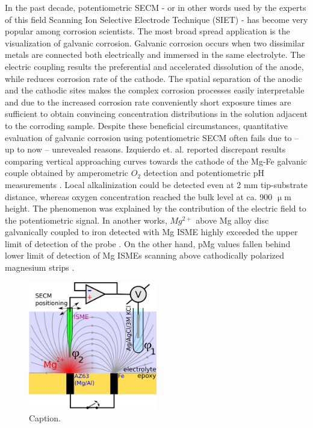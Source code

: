\documentclass[3p]{elsarticle}
\begin{document}
In the past decade, potentiometric SECM - or in other words used by the experts of this field Scanning Ion Selective Electrode Technique (SIET) - has become very popular among corrosion scientists\cite{lamaka, ZnISME, diamondel, cutedge, H+selective, simulating}. The most broad spread application is the visualization of galvanic corrosion\cite{amperopot, chloride, spatiozn, fezn}.
Galvanic corrosion occurs when two dissimilar metals are connected both electrically and immersed in the same electrolyte. The electric coupling results the preferential and accelerated dissolution of the anode, while reduces corrosion rate of the cathode. The spatial separation of the anodic and the cathodic sites makes the complex corrosion processes easily interpretable and due to the increased corrosion rate conveniently short exposure times are sufficient to obtain convincing concentration distributions in the solution adjacent to the corroding sample. Despite these beneficial circumstances, quantitative evaluation of galvanic corrosion using potentiometric SECM often fails due to – up to now – unrevealed reasons.
Izquierdo et. al. reported discrepant results comparing vertical approaching curves towards the cathode of the Mg-Fe galvanic couple obtained by amperometric $O_2$ detection and potentiometric pH measurements \cite{pH15}. Local alkalinization could be detected even at 2 mm tip-substrate distance, whereas oxygen concentration reached the bulk level at ca. 900 $\upmu$m height. The phenomenon was explained by the contribution of the electric field to the potentiometric signal.  
In another works, $Mg^{2+}$ above Mg alloy disc galvanically coupled to iron detected with Mg ISME highly exceeded the upper limit of detection of the probe \cite{overmg1, overmg2, overmg3}.
On the other hand, pMg values fallen behind lower limit of detection of Mg ISMEs scanning above cathodically polarized magnesium strips \cite{belowmg}. 


\begin{figure}[h!]
\centering
\includegraphics[width=0.5\textwidth]{abstract.eps}
\caption{Caption.}
\label{fig:abstract}
\end{figure}
\end{document}
